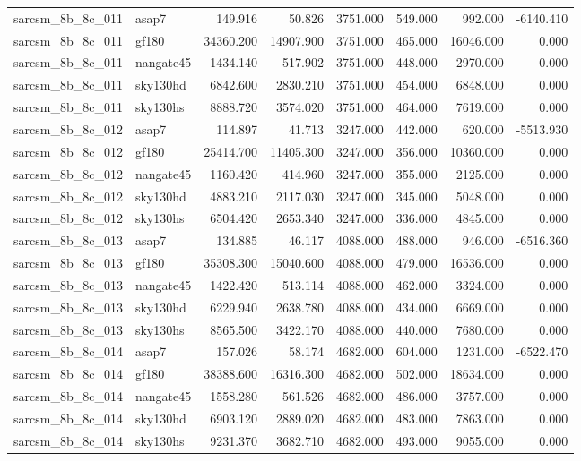 \begin{tabular}{llrrrrrr}
sarcsm\_8b\_8c\_011 & asap7 & 149.916 & 50.826 & 3751.000 & 549.000 & 992.000 & -6140.410 \\
sarcsm\_8b\_8c\_011 & gf180 & 34360.200 & 14907.900 & 3751.000 & 465.000 & 16046.000 & 0.000 \\
sarcsm\_8b\_8c\_011 & nangate45 & 1434.140 & 517.902 & 3751.000 & 448.000 & 2970.000 & 0.000 \\
sarcsm\_8b\_8c\_011 & sky130hd & 6842.600 & 2830.210 & 3751.000 & 454.000 & 6848.000 & 0.000 \\
sarcsm\_8b\_8c\_011 & sky130hs & 8888.720 & 3574.020 & 3751.000 & 464.000 & 7619.000 & 0.000 \\
sarcsm\_8b\_8c\_012 & asap7 & 114.897 & 41.713 & 3247.000 & 442.000 & 620.000 & -5513.930 \\
sarcsm\_8b\_8c\_012 & gf180 & 25414.700 & 11405.300 & 3247.000 & 356.000 & 10360.000 & 0.000 \\
sarcsm\_8b\_8c\_012 & nangate45 & 1160.420 & 414.960 & 3247.000 & 355.000 & 2125.000 & 0.000 \\
sarcsm\_8b\_8c\_012 & sky130hd & 4883.210 & 2117.030 & 3247.000 & 345.000 & 5048.000 & 0.000 \\
sarcsm\_8b\_8c\_012 & sky130hs & 6504.420 & 2653.340 & 3247.000 & 336.000 & 4845.000 & 0.000 \\
sarcsm\_8b\_8c\_013 & asap7 & 134.885 & 46.117 & 4088.000 & 488.000 & 946.000 & -6516.360 \\
sarcsm\_8b\_8c\_013 & gf180 & 35308.300 & 15040.600 & 4088.000 & 479.000 & 16536.000 & 0.000 \\
sarcsm\_8b\_8c\_013 & nangate45 & 1422.420 & 513.114 & 4088.000 & 462.000 & 3324.000 & 0.000 \\
sarcsm\_8b\_8c\_013 & sky130hd & 6229.940 & 2638.780 & 4088.000 & 434.000 & 6669.000 & 0.000 \\
sarcsm\_8b\_8c\_013 & sky130hs & 8565.500 & 3422.170 & 4088.000 & 440.000 & 7680.000 & 0.000 \\
sarcsm\_8b\_8c\_014 & asap7 & 157.026 & 58.174 & 4682.000 & 604.000 & 1231.000 & -6522.470 \\
sarcsm\_8b\_8c\_014 & gf180 & 38388.600 & 16316.300 & 4682.000 & 502.000 & 18634.000 & 0.000 \\
sarcsm\_8b\_8c\_014 & nangate45 & 1558.280 & 561.526 & 4682.000 & 486.000 & 3757.000 & 0.000 \\
sarcsm\_8b\_8c\_014 & sky130hd & 6903.120 & 2889.020 & 4682.000 & 483.000 & 7863.000 & 0.000 \\
sarcsm\_8b\_8c\_014 & sky130hs & 9231.370 & 3682.710 & 4682.000 & 493.000 & 9055.000 & 0.000 \\

\end{tabular}
